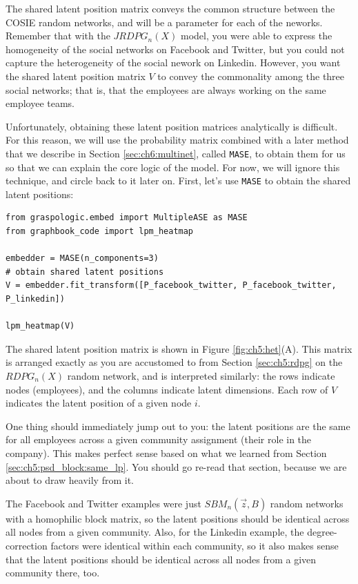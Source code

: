The shared latent position matrix conveys the {common structure} between the COSIE random networks, and will be a parameter for each of the neworks. Remember that with the $JRDPG_n(X)$ model, you were able to express the homogeneity of the social networks on Facebook and Twitter, but you could not capture the heterogeneity of the social nework on Linkedin. However, you want the shared latent position matrix $V$ to convey the commonality among the three social networks; that is, that the employees are always working on the same employee teams. 

Unfortunately, obtaining these latent position matrices analytically is difficult. For this reason, we will use the probability matrix combined with a later method that we describe in Section \ref{sec:ch6:multinet}, called \texttt{MASE}, to obtain them for us so that we can explain the core logic of the model. For now, we will ignore this technique, and circle back to it later on. First, let's use \texttt{MASE} to obtain the shared latent positions:

\begin{lstlisting}[style=python]
from graspologic.embed import MultipleASE as MASE
from graphbook_code import lpm_heatmap

embedder = MASE(n_components=3)
# obtain shared latent positions
V = embedder.fit_transform([P_facebook_twitter, P_facebook_twitter, P_linkedin])

lpm_heatmap(V)
\end{lstlisting}

The shared latent position matrix is shown in Figure \ref{fig:ch5:het}(A). This matrix is arranged exactly as you are accustomed to from Section \ref{sec:ch5:rdpg} on the $RDPG_n(X)$ random network, and is interpreted similarly: the rows indicate nodes (employees), and the columns indicate latent dimensions. Each row of $V$ indicates the latent position of a given node $i$.

One thing should immediately jump out to you: the latent positions are the {same} for all employees across a given community assignment (their role in the company). This makes perfect sense based on what we learned from Section \ref{sec:ch5:psd_block:same_lp}. You should go re-read that section, because we are about to draw heavily from it.

The Facebook and Twitter examples were just $SBM_n(\vec z, B)$ random networks with a homophilic block matrix, so the latent positions should be identical across all nodes from a given community. Also, for the Linkedin example, the degree-correction factors were identical within each community, so it also makes sense that the latent positions should be identical across all nodes from a given community there, too.

